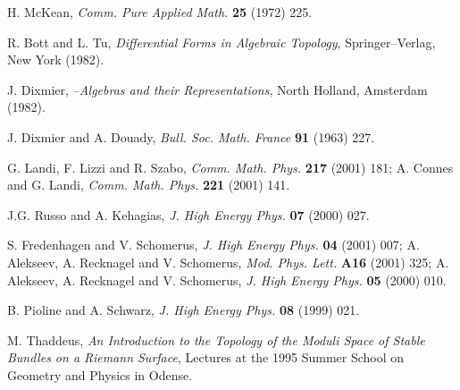 \documentclass[a4paper,a4paper]{article}
\begin{document}
\begin{thebibliography}{99}
H. McKean, {\it Comm. Pure Applied Math.} {\bf 25} (1972) 225.   

R. Bott and L. Tu, {\it Differential Forms in Algebraic Topology}, 
Springer--Verlag, New York (1982). 

J. Dixmier, {\it {}\coordHE{}--Algebras and their Representations}, North 
Holland, Amsterdam (1982).

J. Dixmier and A. Douady, {\it Bull. Soc. Math. France} {\bf 91} (1963) 227. 

G. Landi, F. Lizzi and R. Szabo, {\it Comm. Math. Phys.} {\bf 217} (2001) 
181; A. Connes and G. Landi, {\it Comm. Math. Phys.} {\bf 221} (2001) 141.

J.G. Russo and A. Kehagias, {\it J. High Energy Phys.} {\bf 07} (2000) 027.

S. Fredenhagen and V. Schomerus, 
{\it J. High Energy Phys.} {\bf 04} (2001) 007;
A. Alekseev, A. Recknagel and V. Schomerus, {\it Mod. Phys. Lett.} {\bf 
A16} (2001) 325;
A. Alekseev, A. Recknagel and V. Schomerus, {\it J. High Energy Phys.} 
{\bf 05} (2000) 010.

B. Pioline and A. Schwarz, {\it J. High Energy Phys.} {\bf 08} (1999) 021.

M. Thaddeus, {\it An Introduction to the Topology of the Moduli Space of 
Stable Bundles on a Riemann Surface}, Lectures at the 1995 Summer School 
on Geometry and Physics in Odense.

\end{thebibliography}  
\end{document}
